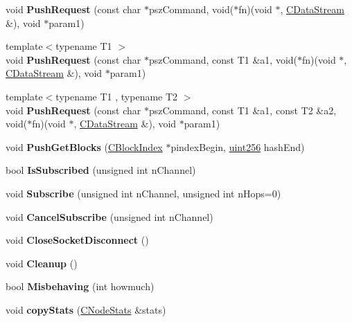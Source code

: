 \begin{DoxyCompactItemize}
\item 
\mbox{\label{class_c_node_a50fa5e53e4a5b7b201238d3b5100e869}} 
void {\bfseries Push\+Request} (const char $\ast$psz\+Command, void($\ast$fn)(void $\ast$, \mbox{\hyperlink{class_c_data_stream}{C\+Data\+Stream}} \&), void $\ast$param1)
\item 
\mbox{\label{class_c_node_ab3a8e3bf56a7ad8892d8aeeef671e086}} 
{\footnotesize template$<$typename T1 $>$ }\\void {\bfseries Push\+Request} (const char $\ast$psz\+Command, const T1 \&a1, void($\ast$fn)(void $\ast$, \mbox{\hyperlink{class_c_data_stream}{C\+Data\+Stream}} \&), void $\ast$param1)
\item 
\mbox{\label{class_c_node_afe73133d21440cb87db728813645239d}} 
{\footnotesize template$<$typename T1 , typename T2 $>$ }\\void {\bfseries Push\+Request} (const char $\ast$psz\+Command, const T1 \&a1, const T2 \&a2, void($\ast$fn)(void $\ast$, \mbox{\hyperlink{class_c_data_stream}{C\+Data\+Stream}} \&), void $\ast$param1)
\item 
\mbox{\label{class_c_node_a067738331c342d96e51aff02228c5d0d}} 
void {\bfseries Push\+Get\+Blocks} (\mbox{\hyperlink{class_c_block_index}{C\+Block\+Index}} $\ast$pindex\+Begin, \mbox{\hyperlink{classuint256}{uint256}} hash\+End)
\item 
\mbox{\label{class_c_node_a2309cc5f763bce683337201ea5a640a2}} 
bool {\bfseries Is\+Subscribed} (unsigned int n\+Channel)
\item 
\mbox{\label{class_c_node_a47f2a21abf98bd2d2dba2894124d3114}} 
void {\bfseries Subscribe} (unsigned int n\+Channel, unsigned int n\+Hops=0)
\item 
\mbox{\label{class_c_node_ac1be1dbc7917e7f5956dd063bd6f271d}} 
void {\bfseries Cancel\+Subscribe} (unsigned int n\+Channel)
\item 
\mbox{\label{class_c_node_a63a6091a0b0fc0987d9436e1ec708423}} 
void {\bfseries Close\+Socket\+Disconnect} ()
\item 
\mbox{\label{class_c_node_a3220e5f99d9e5c31fba2f3b6508c9425}} 
void {\bfseries Cleanup} ()
\item 
\mbox{\label{class_c_node_a1923dffc7124eeedcc4bb58c2cd75754}} 
bool {\bfseries Misbehaving} (int howmuch)
\item 
\mbox{\label{class_c_node_aaa77188d9df85b80e3f8a30292acf6a9}} 
void {\bfseries copy\+Stats} (\mbox{\hyperlink{class_c_node_stats}{C\+Node\+Stats}} \&stats)
\end{DoxyCompactItemize}
